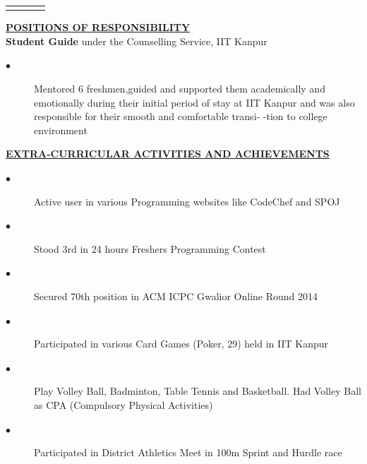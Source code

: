 \documentclass[10pt]{article}
\begin{document}
\begin{flushleft}
\begin{tabular}{c c c c}
\hline \\
\end{tabular}
{\large \textbf{\underline{POSITIONS OF RESPONSIBILITY}}}\\
\textbf{Student Guide} under the Counselling Service, IIT Kanpur
\begin{description}
\item[$\bullet$]Mentored 6 freshmen,guided and supported them academically and emotionally during their  initial  period of stay at  IIT Kanpur and  was also responsible for their smooth and comfortable transi- -tion to college environment
\end{description}
{\large \textbf{\underline{EXTRA-CURRICULAR ACTIVITIES AND ACHIEVEMENTS}}}
\begin{description}
\item[$\bullet$]Active user in various Programming websites like CodeChef and SPOJ
\item[$\bullet$]Stood 3rd in 24 hours Freshers Programming Contest
\item[$\bullet$]Secured 70th position in ACM ICPC Gwalior Online Round 2014
\item[$\bullet$]Participated in various Card Games (Poker, 29) held in IIT Kanpur
\item[$\bullet$]Play Volley Ball, Badminton, Table Tennis and Basketball. Had Volley Ball as CPA (Compulsory Physical Activities)
\item[$\bullet$]Participated in District Athletics Meet in 100m Sprint and Hurdle race
\end{description}
\end{flushleft}
\end{document}
